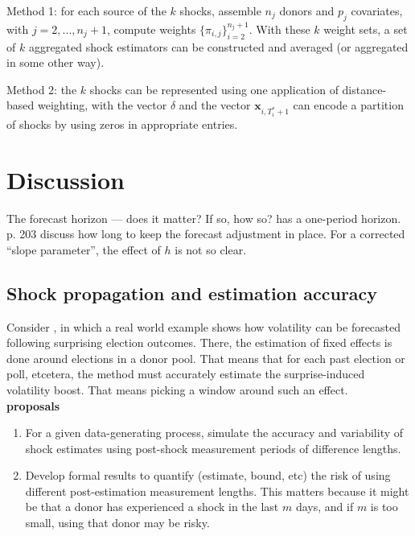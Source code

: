 \documentclass[11pt]{article}
\newcommand{\x}{\textbf{x}}
\theoremstyle{definition}
\begin{document}
Method 1: for each source of the $k$ shocks, assemble $n_{j}$ donors and $p_{j}$ covariates, with $j=2,...,n_{j}+1$, compute weights $\{\pi_{i,j}\}^{n_{j}+1}_{i=2}$.  With these $k$ weight sets, a set of $k$ aggregated shock estimators can be constructed and averaged (or aggregated in some other way).

Method 2: the $k$ shocks can be represented using one application of distance-based weighting, with the vector $\delta$ and the vector $\x_{i,T^{*}_{i}+1}$ can encode a partition of shocks by using zeros in appropriate entries.

\section{Discussion}

The forecast horizon --- does it matter?  If so, how so?  \cite{lin2021minimizing} has a one-period horizon.  \cite{clements1998forecasting}{p. 203} discuss how long to keep the forecast adjustment in place.  For a corrected ``slope parameter'', the effect of $h$ is not so clear.\\

\subsection{Shock propagation and estimation accuracy}
Consider \cite{lundquist2024volatility}, in which a real world example shows how volatility can be forecasted following surprising election outcomes.  There, the estimation of fixed effects is done around elections in a donor pool.  That means that for each past election or poll, etcetera, the method must accurately estimate the surprise-induced volatility boost.  That means picking a window around such an effect.\\

\textbf{proposals}
\begin{enumerate}
  \item For a given data-generating process, simulate the accuracy and variability of shock estimates using post-shock measurement periods of difference lengths.
  \item Develop formal results to quantify (estimate, bound, etc) the risk of using different post-estimation measurement lengths.  This matters because it might be that a donor has experienced a shock in the last $m$ days, and if $m$ is too small, using that donor may be risky.
\end{enumerate}
    
\end{document}
